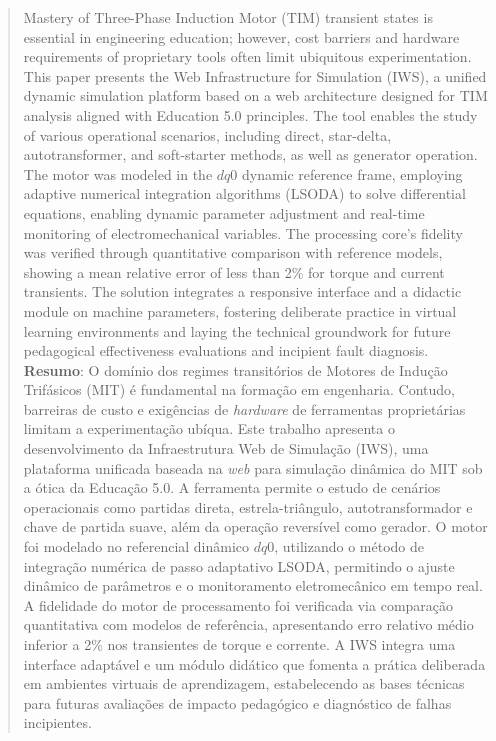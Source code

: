 \documentclass[a4paper]{ifacconf}
\begin{document}
\begin{frontmatter}
\address[First]{Diretoria de Indústria, Campus Natal-Central, Instituto Federal de Educação, Ciência e Tecnologia do Rio Grande do Norte (IFRN), RN. (e-mail: k.g.pinheiro.castro@gmail.com; marcus.fernandes@ifrn.edu.br; vitrsn@gmail.com; vinicius.alex.melo@hotmail.com; calebe8839@gmail.com)} 
\vskip 1mm%
\renewcommand{\abstractname}{{\bf Abstract:~}}
\begin{abstract}                %
Mastery of Three-Phase Induction Motor (TIM) transient states is essential in engineering education; however, cost barriers and hardware requirements of proprietary tools often limit ubiquitous experimentation. This paper presents the Web Infrastructure for Simulation (IWS), a unified dynamic simulation platform based on a web architecture designed for TIM analysis aligned with Education 5.0 principles. The tool enables the study of various operational scenarios, including direct, star-delta, autotransformer, and soft-starter methods, as well as generator operation. The motor was modeled in the $dq0$ dynamic reference frame, employing adaptive numerical integration algorithms (LSODA) to solve differential equations, enabling dynamic parameter adjustment and real-time monitoring of electromechanical variables. The processing core's fidelity was verified through quantitative comparison with reference models, showing a mean relative error of less than 2\% for torque and current transients. The solution integrates a responsive interface and a didactic module on machine parameters, fostering deliberate practice in virtual learning environments and laying the technical groundwork for future pedagogical effectiveness evaluations and incipient fault diagnosis.
\vskip 1mm%
{\noindent \bf Resumo}: O domínio dos regimes transitórios de Motores de Indução Trifásicos (MIT) é fundamental na formação em engenharia. Contudo, barreiras de custo e exigências de \textit{hardware} de ferramentas proprietárias limitam a experimentação ubíqua. Este trabalho apresenta o desenvolvimento da Infraestrutura Web de Simulação (IWS), uma plataforma unificada baseada na \textit{web} para simulação dinâmica do MIT sob a ótica da Educação 5.0. A ferramenta permite o estudo de cenários operacionais como partidas direta, estrela-triângulo, autotransformador e chave de partida suave, além da operação reversível como gerador. O motor foi modelado no referencial dinâmico $dq0$, utilizando o método de integração numérica de passo adaptativo LSODA, permitindo o ajuste dinâmico de parâmetros e o monitoramento eletromecânico em tempo real. A fidelidade do motor de processamento foi verificada via comparação quantitativa com modelos de referência, apresentando erro relativo médio inferior a 2\% nos transientes de torque e corrente. A IWS integra uma interface adaptável e um módulo didático que fomenta a prática deliberada em ambientes virtuais de aprendizagem, estabelecendo as bases técnicas para futuras avaliações de impacto pedagógico e diagnóstico de falhas incipientes.
\end{abstract}


\end{frontmatter}
\end{document}
